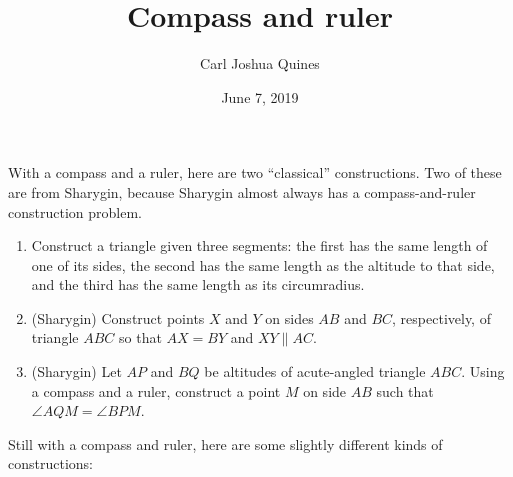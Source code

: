 \documentclass[11pt,paper=letter]{scrartcl}
\begin{document}
\title{Compass and ruler}
\author{Carl Joshua Quines}
\date{June 7, 2019}

\maketitle

\noindent With a compass and a ruler, here are two ``classical'' constructions. Two of these are from Sharygin, because Sharygin almost always has a compass-and-ruler construction problem.

\begin{enumerate}
  \item Construct a triangle given three segments: the first has the same length of one of its sides, the second has the same length as the altitude to that side, and the third has the same length as its circumradius. %

  \item (Sharygin) Construct points $X$ and $Y$ on sides $AB$ and $BC$, respectively, of triangle $ABC$ so that $AX = BY$ and $XY \parallel AC$.%

  \item (Sharygin) Let $AP$ and $BQ$ be altitudes of acute-angled triangle $ABC$. Using a compass and a ruler, construct a point $M$ on side $AB$ such that $\angle AQM = \angle BPM$. %
\end{enumerate}

\noindent Still with a compass and ruler, here are some slightly different kinds of constructions:
\end{document}
